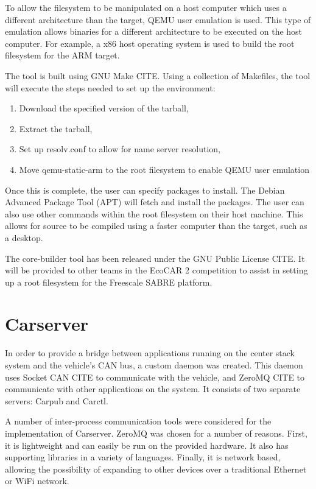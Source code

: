 \documentclass[ece]{uw-wkrpt}
\begin{document}
To allow the filesystem to be manipulated on a host computer which uses a
different architecture than the target, QEMU user emulation is used. This type
of emulation allows binaries for a different architecture to be executed on the
host computer. For example, a x86 host operating system is used to build the
root filesystem for the ARM target.

The tool is built using GNU Make CITE. Using a collection of Makefiles, the 
tool will execute the steps needed to set up the environment:

\begin{enumerate}
  \item Download the specified version of the tarball,
  \item Extract the tarball,
  \item Set up resolv.conf to allow for name server resolution,
  \item Move qemu-static-arm to the root filesystem to enable QEMU user
  emulation
\end{enumerate}

Once this is complete, the user can specify packages to install. The Debian
Advanced Package Tool (APT) will fetch and install the packages. The user can
also use other commands within the root filesystem on their host machine. This
allows for source to be compiled using a faster computer than the target, such
as a desktop.

The core-builder tool has been released under the GNU Public License
CITE. It will be provided to other teams in the EcoCAR 2 competition to assist in
setting up a root filesystem for the Freescale SABRE platform.

\section{Carserver}

In order to provide a bridge between applications running on the center stack
system and the vehicle's CAN bus, a custom daemon was created. This daemon uses
Socket CAN CITE to communicate with the vehicle, and ZeroMQ CITE to communicate
with other applications on the system. It consists of two separate servers:
Carpub and Carctl.

A number of inter-process communication tools were considered for the
implementation of Carserver. ZeroMQ was chosen for a number of reasons. First,
it is lightweight and can easily be run on the provided hardware. It also has
supporting libraries in a variety of languages. Finally, it is network based,
allowing the possibility of expanding to other devices over a traditional
Ethernet or WiFi network.
\end{document}
